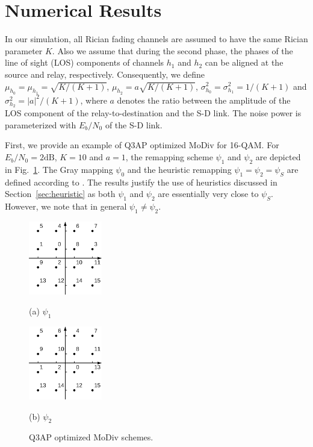 \documentclass[journal,draftcls,onecolumn,12pt,twoside]{IEEEtran}
\begin{document}
\section{Numerical Results}
\label{sec:simulation}
In our simulation, all Rician fading channels are assumed to have the same
Rician parameter $K$. Also we assume that during the second phase, the phases of the
line of sight (LOS) components of channels $h_1$ and $h_2$ can be aligned at the
source and relay, respectively.
Consequently, we define $\mu_{h_0} = \mu_{h_1} = \sqrt{K/(K + 1)}$,
$\mu_{h_2}=a\sqrt{K/(K + 1)}$,  $\sigma_{h_0}^2 = \sigma_{h_1}^2 = 1/(K+1)$ and
$\sigma_{h_2}^2 = |a|^2/(K+1)$, where $a$ denotes the ratio
between the amplitude of the LOS component of the
relay-to-destination and the S-D link. The noise power is
parameterized with $E_b/N_0$ of the S-D link.

First, we provide an example of Q3AP optimized MoDiv for 16-QAM. For $E_b/N_0 =
2\mbox{dB}$, $K = 10$ and $a = 1$, the remapping scheme $\psi_1$ and $\psi_2$
are depicted in Fig.~\ref{fig:example}. The Gray mapping $\psi_0$ and the
heuristic remapping $\psi_1=\psi_2=\psi_S$ are defined according to
\cite{seddik2008trans}. The results justify the use of heuristics discussed in
Section~\ref{sec:heuristic} as both $\psi_1$ and $\psi_2$ are essentially very
close to $\psi_S$. However, we note that in general $\psi_1\not=\psi_2$.

\begin{figure}[!t]
    \begin{minipage}[b]{0.48\linewidth}
      \centering
      \centerline{\includegraphics[width=3.2cm]{./figs/psi1.eps}}
      \centerline{(a) $\psi_1$}\medskip
    \end{minipage}
    \hfill
    \begin{minipage}[b]{.48\linewidth}
      \centering
      \centerline{\includegraphics[width=3.2cm]{./figs/psi2.eps}}
      \centerline{(b) $\psi_2$}\medskip
    \end{minipage}
    \caption{Q3AP optimized MoDiv schemes.}
    \label{fig:example}
\end{figure}
\end{document}
